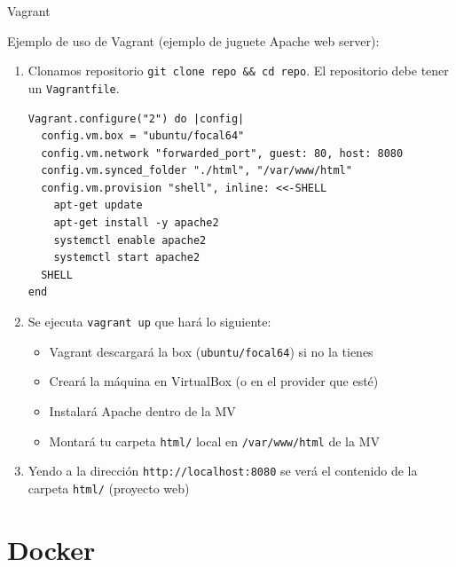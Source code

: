 \documentclass{beamer}
\begin{document}
\begin{frame}[fragile]{Vagrant}

Ejemplo de uso de Vagrant (ejemplo de juguete Apache web server):

\begin{enumerate}
    \item Clonamos repositorio \texttt{git clone repo \&\& cd repo}. El repositorio debe tener un \texttt{Vagrantfile}.
    \begin{verbatim}
Vagrant.configure("2") do |config|
  config.vm.box = "ubuntu/focal64"
  config.vm.network "forwarded_port", guest: 80, host: 8080
  config.vm.synced_folder "./html", "/var/www/html"
  config.vm.provision "shell", inline: <<-SHELL
    apt-get update
    apt-get install -y apache2
    systemctl enable apache2
    systemctl start apache2
  SHELL
end
\end{verbatim}
    
    \item Se ejecuta \texttt{vagrant up} que hará lo siguiente:
    \begin{itemize}
        \item Vagrant descargará la box (\texttt{ubuntu/focal64}) si no la tienes
        \item Creará la máquina en VirtualBox (o en el provider que esté)
        \item Instalará Apache dentro de la MV
        \item Montará tu carpeta \texttt{html/} local en \texttt{/var/www/html} de la MV

    \end{itemize}
    \item Yendo a la dirección \texttt{http://localhost:8080} se verá el contenido de la carpeta \texttt{html/} (proyecto web)
\end{enumerate}
    
\end{frame}




\section{Docker}
\end{document}
